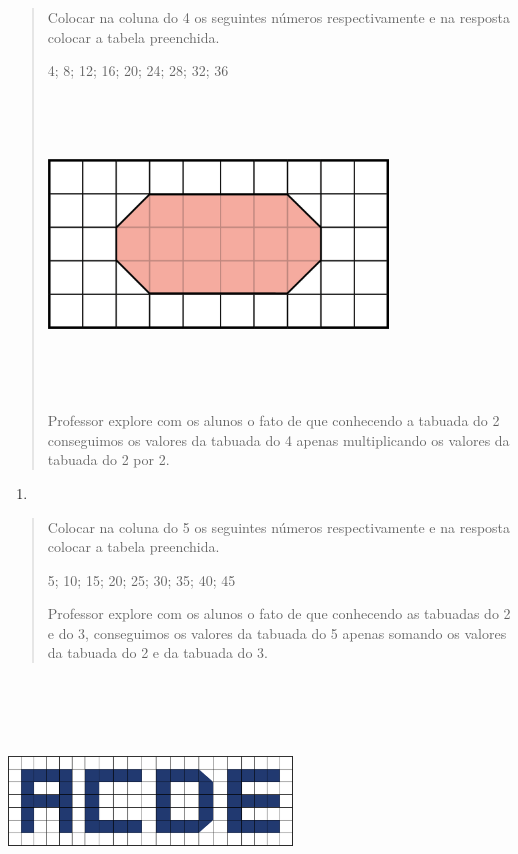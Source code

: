 \begin{quote}
Colocar na coluna do 4 os seguintes números respectivamente e na
resposta colocar a tabela preenchida.

4; 8; 12; 16; 20; 24; 28; 32; 36

\includegraphics[width=3.55833in,height=3.10173in]{media/image33.png}

Professor explore com os alunos o fato de que conhecendo a tabuada do 2
conseguimos os valores da tabuada do 4 apenas multiplicando os valores
da tabuada do 2 por 2.
\end{quote}

\begin{enumerate}
\def\labelenumi{\alph{enumi})}
\item
\end{enumerate}

\begin{quote}
Colocar na coluna do 5 os seguintes números respectivamente e na
resposta colocar a tabela preenchida.

5; 10; 15; 20; 25; 30; 35; 40; 45

Professor explore com os alunos o fato de que conhecendo as tabuadas do
2 e do 3, conseguimos os valores da tabuada do 5 apenas somando os
valores da tabuada do 2 e da tabuada do 3.
\end{quote}

\includegraphics[width=2.96667in,height=2.58563in]{media/image34.png}

